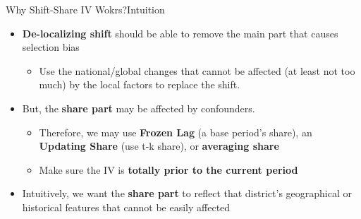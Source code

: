 \documentclass[dvipsnames,hyperref={pdfpagelabels=false}]{beamer}
\begin{document}
\begin{frame}{Why Shift-Share IV Wokrs?}{Intuition}
	\begin{itemize}
		\item \textbf{De-localizing shift} should be able to remove the main part that causes selection bias
														\vspace{0.2cm}
			\begin{itemize}
		\item Use the national/global changes that cannot be affected (at least not too much) by the local factors to replace the shift.
										\end{itemize}			
		
		
												\vspace{0.2cm}
		\item But, the \textbf{share part} may be affected by confounders.
												\vspace{0.2cm}
													\begin{itemize}
		\item Therefore, we may use \textbf{Frozen Lag} (a base period's share), an \textbf{Updating Share} (use t-k share), or \textbf{averaging share}
										\vspace{0.2cm}
		\item Make sure the IV is \textbf{totally prior to the current period}
										\vspace{0.2cm}
								\end{itemize}			
		\item Intuitively, we want the \textbf{share part} to reflect that district's geographical or historical features that cannot be easily affected
	\end{itemize}
\end{frame}
\end{document}
